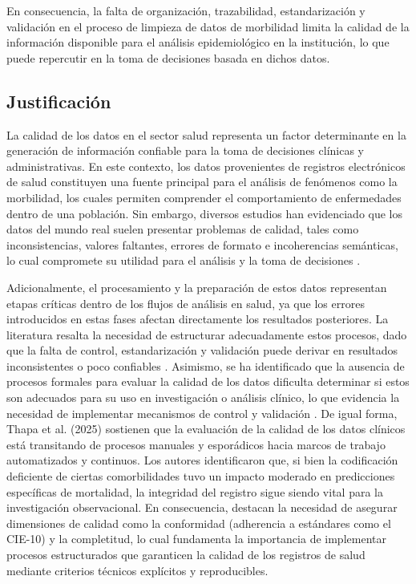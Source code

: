 \documentclass[12pt, letterpaper, oneside]{article}
\begin{document}
En consecuencia, la falta de organización, trazabilidad, estandarización y validación en el proceso de limpieza de datos de morbilidad limita la calidad de la información disponible para el análisis epidemiológico en la institución, lo que puede repercutir en la toma de decisiones basada en dichos datos.

\subsection{Justificación}

La calidad de los datos en el sector salud representa un factor determinante en la generación de información confiable para la toma de decisiones clínicas y administrativas. En este contexto, los datos provenientes de registros electrónicos de salud constituyen una fuente principal para el análisis de fenómenos como la morbilidad, los cuales permiten comprender el comportamiento de enfermedades dentro de una población. Sin embargo, diversos estudios han evidenciado que los datos del mundo real suelen presentar problemas de calidad, tales como inconsistencias, valores faltantes, errores de formato e incoherencias semánticas, lo cual compromete su utilidad para el análisis y la toma de decisiones \parencite{lighterness_data_2024, ben_scalable_2024}.

Adicionalmente, el procesamiento y la preparación de estos datos representan etapas críticas dentro de los flujos de análisis en salud, ya que los errores introducidos en estas fases afectan directamente los resultados posteriores. La literatura resalta la necesidad de estructurar adecuadamente estos procesos, dado que la falta de control, estandarización y validación puede derivar en resultados inconsistentes o poco confiables \parencite{albu_challenges_2025, petri_clinical_2025}. Asimismo, se ha identificado que la ausencia de procesos formales para evaluar la calidad de los datos dificulta determinar si estos son adecuados para su uso en investigación o análisis clínico, lo que evidencia la necesidad de implementar mecanismos de control y validación \parencite{blacketer_using_2021}. De igual forma, Thapa et al. (2025) sostienen que la evaluación de la calidad de los datos clínicos está transitando de procesos manuales y esporádicos hacia marcos de trabajo automatizados y continuos. Los autores identificaron que, si bien la codificación deficiente de ciertas comorbilidades tuvo un impacto moderado en predicciones específicas de mortalidad, la integridad del registro sigue siendo vital para la investigación observacional. En consecuencia, destacan la necesidad de asegurar dimensiones de calidad como la conformidad (adherencia a estándares como el CIE-10) y la completitud, lo cual fundamenta la importancia de implementar procesos estructurados que garanticen la calidad de los registros de salud mediante criterios técnicos explícitos y reproducibles.
\end{document}
